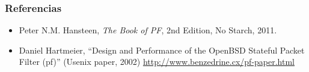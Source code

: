 \documentclass{beamer}
\begin{document}
\begin{frame}
\frametitle{Referencias}

\begin{itemize}
\item Peter N.M. Hansteen, \textit{The Book of PF}, 2nd Edition, No Starch, 2011.
\item Daniel Hartmeier, ``Design and Performance of the OpenBSD Stateful Packet Filter (pf)'' (Usenix paper, 2002) \url{http://www.benzedrine.cx/pf-paper.html}
\end{itemize}

\end{frame}






\end{document}
